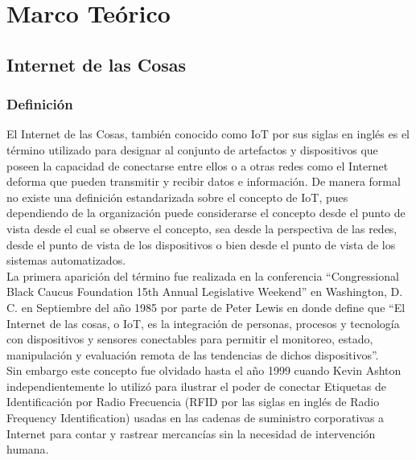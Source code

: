 
\part{Marco Teórico}
\chapter{Internet de las Cosas}

\section{Definición}
El Internet de las Cosas, también conocido como IoT por sus siglas en inglés es el término utilizado para designar al conjunto de artefactos y dispositivos que poseen la capacidad de conectarse entre ellos o a otras redes como el Internet deforma que pueden transmitir y recibir datos e información. De manera formal no existe una definición estandarizada sobre el concepto de IoT, pues dependiendo de la organización puede considerarse el concepto desde el punto de vista desde el cual se observe el concepto, sea desde la perspectiva de las redes, desde el punto de vista de los dispositivos o bien desde el punto de vista de los sistemas automatizados.\\

La primera aparición del término fue realizada en la conferencia ``Congressional Black Caucus Foundation 15th Annual Legislative Weekend'' en Washington, D. C. en Septiembre del año 1985 por parte de Peter Lewis \cite{IoTTrueHistory} en donde define que ``El Internet de las cosas, o IoT, es la integración de personas, procesos y tecnología con dispositivos y sensores conectables para permitir el monitoreo, estado, manipulación y evaluación remota de las tendencias de dichos dispositivos''\cite{IoTFirstDef}.\\

Sin embargo este concepto fue olvidado hasta el año 1999 cuando Kevin Ashton independientemente lo utilizó para ilustrar el poder de conectar Etiquetas de Identificación por Radio Frecuencia (RFID por las siglas en inglés de Radio Frequency Identification) usadas en las cadenas de suministro corporativas a Internet para contar y rastrear mercancías sin la necesidad de intervención humana\cite{iotInternetSociety}.\\

